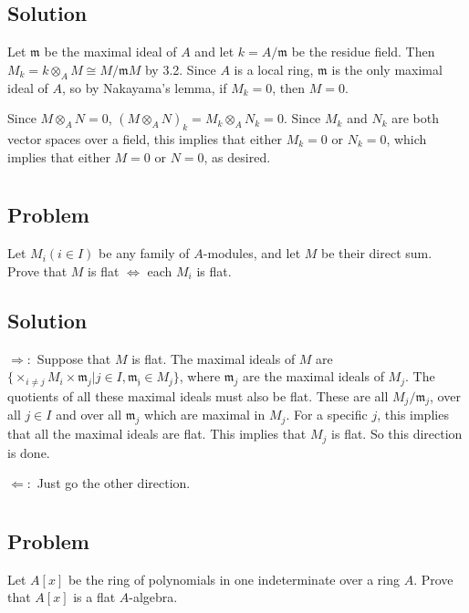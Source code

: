 \documentclass[book,12pt,oneside,openany]{memoir}
\begin{document}
\subsection{Solution}
Let $\mathfrak{m}$ be the maximal ideal of $A$ and let $k = A/\mathfrak{m}$ be the residue field. Then $M_k = k \otimes_A M \cong M/\mathfrak{m}M$ by 3.2. Since $A$ is a local ring, $\mathfrak{m}$ is the only maximal ideal of $A$, so by Nakayama's lemma, if $M_k = 0$, then $M = 0$. 

Since $M \otimes_{A} N = 0$, $(M \otimes_{A} N)_k = M_k \otimes_{A} N_k = 0$. Since $M_k$ and $N_k$ are both vector spaces over a field, this implies that either $M_k = 0$ or $N_k = 0$, which implies that either $M = 0$ or $N= 0$, as desired.

\section{}
\subsection{Problem}
Let $M_i (i \in I)$ be any family of $A$-modules, and let $M$ be their direct sum. Prove that $M$ is flat $\Leftrightarrow$ each $M_i$ is flat.

\subsection{Solution}
$\Rightarrow:$ Suppose that $M$ is flat. The maximal ideals of $M$ are $\{\times_{i \neq j} M_i  \times \mathfrak{m}_j | j \in I, \mathfrak{m_j} \in M_j\}$, where $\mathfrak{m}_j$ are the maximal ideals of $M_j$. The quotients of all these maximal ideals must also be flat. These are all $M_j/\mathfrak{m}_j$, over all $j \in I$ and over all $\mathfrak{m}_j$ which are maximal in $M_j$. For a specific $j$, this implies that all the maximal ideals are flat. This implies that $M_j$ is flat. So this direction is done.

$\Leftarrow:$ Just go the other direction.


\section{}
\subsection{Problem}
Let $A[x]$ be the ring of polynomials in one indeterminate over a ring $A$. Prove that $A[x]$ is a flat $A$-algebra.
\end{document}
